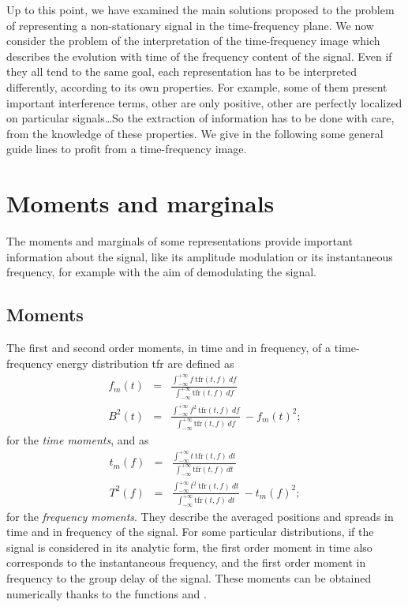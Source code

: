 
Up to this point, we have examined the main solutions proposed to
the problem of representing a non-stationary signal in the
time-frequency plane. We now consider the problem of the
interpretation of the time-frequency image which describes the
evolution with time of the frequency content of the signal. Even if they
all tend to the same goal, each representation has to be interpreted
differently, according to its own properties. For example, some of
them present important interference terms, other are only positive,
other are perfectly localized on particular signals\ldots So the
extraction of information has to be done with care, from the knowledge
of these properties. We give in the following some general guide lines
to profit from a time-frequency image.


\section{Moments and marginals}
  The moments and marginals of some representations provide important
information about the signal, like its amplitude modulation or its
instantaneous frequency, for example with the aim of demodulating the
signal. 

\subsection{Moments}
  The first and second order moments, in time and in frequency, of a
time-frequency energy distribution tfr are defined as
\begin{eqnarray*}
f_m(t) &=& \frac{\int_{-\infty}^{+\infty} f\ \mbox{tfr}(t,f)\ df}
{\int_{-\infty}^{+\infty} \mbox{tfr}(t,f)\ df}\ 
  \\
B^2(t)  &=& \frac{\int_{-\infty}^{+\infty} f^2\ \mbox{tfr}(t,f)\ df}
{\int_{-\infty}^{+\infty} \mbox{tfr}(t,f)\ df}\  - f_m(t)^2; 
\end{eqnarray*}
for the {\it time moments}, and as
\begin{eqnarray*}
t_m(f) &=& \frac{\int_{-\infty}^{+\infty} t\ \mbox{tfr}(t,f)\ dt}
{\int_{-\infty}^{+\infty} \mbox{tfr}(t,f)\ dt}\\ 
T^2(f)  &=& \frac{\int_{-\infty}^{+\infty} t^2\ \mbox{tfr}(t,f)\ dt}
{\int_{-\infty}^{+\infty} \mbox{tfr}(t,f)\ dt}\ - t_m(f)^2; 
\end{eqnarray*}
for the {\it frequency moments}. They describe the averaged positions and
spreads in time and in frequency of the signal. For some particular
distributions, if the signal is considered in its analytic form, the first
order moment in time also corresponds to the instantaneous frequency, and
the first order moment in frequency to the group delay of the signal. These
moments can be obtained numerically thanks to the functions
 and \index{\ttfamily
momftfr}{\ttfamily momftfr.m}.
  
